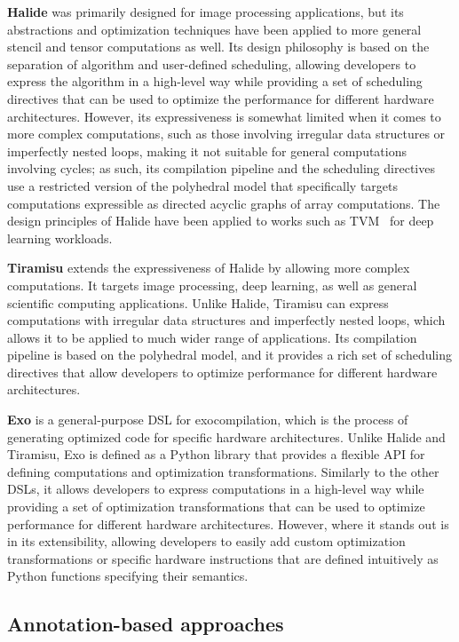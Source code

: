 \textbf{Halide} was primarily designed for image processing applications, but its abstractions and optimization techniques have been applied to more general stencil and tensor computations as well. Its design philosophy is based on the separation of algorithm and user-defined scheduling, allowing developers to express the algorithm in a high-level way while providing a set of scheduling directives that can be used to optimize the performance for different hardware architectures. However, its expressiveness is somewhat limited when it comes to more complex computations, such as those involving irregular data structures or imperfectly nested loops, making it not suitable for general computations involving cycles; as such, its compilation pipeline and the scheduling directives use a restricted version of the polyhedral model that specifically targets computations expressible as directed acyclic graphs of array computations. The design principles of Halide have been applied to works such as TVM~\cite{chen2018tvm} for deep learning workloads.

\textbf{Tiramisu} extends the expressiveness of Halide by allowing more complex computations. It targets image processing, deep learning, as well as general scientific computing applications. Unlike Halide, Tiramisu can express computations with irregular data structures and imperfectly nested loops, which allows it to be applied to much wider range of applications. Its compilation pipeline is based on the polyhedral model, and it provides a rich set of scheduling directives that allow developers to optimize performance for different hardware architectures.

\textbf{Exo} is a general-purpose DSL for exocompilation, which is the process of generating optimized code for specific hardware architectures. Unlike Halide and Tiramisu, Exo is defined as a Python library that provides a flexible API for defining computations and optimization transformations. Similarly to the other DSLs, it allows developers to express computations in a high-level way while providing a set of optimization transformations that can be used to optimize performance for different hardware architectures. However, where it stands out is in its extensibility, allowing developers to easily add custom optimization transformations or specific hardware instructions that are defined intuitively as Python functions specifying their semantics.


\subsection{Annotation-based approaches}\label{sec:annotation-based}

